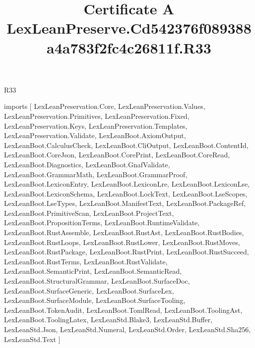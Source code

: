 \begin{lexlean}{R33}
\title{Certificate A LexLeanPreserve.Cd542376f089388a4a783f2fc4c26811f.R33}
\begin{coremodule}
imports [
  LexLeanPreservation.Core,
  LexLeanPreservation.Values,
  LexLeanPreservation.Primitives,
  LexLeanPreservation.Fixed,
  LexLeanPreservation.Keys,
  LexLeanPreservation.Templates,
  LexLeanPreservation.Validate,
  LexLeanBoot.AxiomOutput,
  LexLeanBoot.CalculusCheck,
  LexLeanBoot.CliOutput,
  LexLeanBoot.ContentId,
  LexLeanBoot.CoreJson,
  LexLeanBoot.CorePrint,
  LexLeanBoot.CoreRead,
  LexLeanBoot.Diagnostics,
  LexLeanBoot.GnafValidate,
  LexLeanBoot.GrammarMath,
  LexLeanBoot.GrammarProof,
  LexLeanBoot.LexiconEntry,
  LexLeanBoot.LexiconLre,
  LexLeanBoot.LexiconLse,
  LexLeanBoot.LexiconSchema,
  LexLeanBoot.LockText,
  LexLeanBoot.LseScopes,
  LexLeanBoot.LseTypes,
  LexLeanBoot.ManifestText,
  LexLeanBoot.PackageRef,
  LexLeanBoot.PrimitiveScan,
  LexLeanBoot.ProjectText,
  LexLeanBoot.PropositionTerms,
  LexLeanBoot.RuntimeValidate,
  LexLeanBoot.RustAssemble,
  LexLeanBoot.RustAst,
  LexLeanBoot.RustBodies,
  LexLeanBoot.RustLoops,
  LexLeanBoot.RustLower,
  LexLeanBoot.RustMoves,
  LexLeanBoot.RustPackage,
  LexLeanBoot.RustPrint,
  LexLeanBoot.RustSucceed,
  LexLeanBoot.RustTerms,
  LexLeanBoot.RustValidate,
  LexLeanBoot.SemanticPrint,
  LexLeanBoot.SemanticRead,
  LexLeanBoot.StructuralGrammar,
  LexLeanBoot.SurfaceDoc,
  LexLeanBoot.SurfaceGeneric,
  LexLeanBoot.SurfaceLex,
  LexLeanBoot.SurfaceModule,
  LexLeanBoot.SurfaceTooling,
  LexLeanBoot.TokenAudit,
  LexLeanBoot.TomlRead,
  LexLeanBoot.ToolingAst,
  LexLeanBoot.ToolingLatex,
  LexLeanStd.Blake3,
  LexLeanStd.Buffer,
  LexLeanStd.Json,
  LexLeanStd.Numeral,
  LexLeanStd.Order,
  LexLeanStd.Sha256,
  LexLeanStd.Text
]


\end{coremodule}
\end{lexlean}
